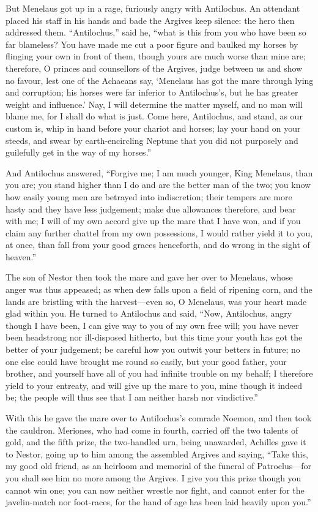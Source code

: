 But Menelaus got up in a rage, furiously angry with Antilochus. An
attendant placed his staff in his hands and bade the Argives keep silence:
the hero then addressed them. “Antilochus,” said he, “what is this from
you who have been so far blameless? You have made me cut a poor figure and
baulked my horses by flinging your own in front of them, though yours are
much worse than mine are; therefore, O princes and counsellors of the
Argives, judge between us and show no favour, lest one of the Achaeans
say, ‘Menelaus has got the mare through lying and corruption; his horses
were far inferior to Antilochus’s, but he has greater weight and
influence.’ Nay, I will determine the matter myself, and no man will blame
me, for I shall do what is just. Come here, Antilochus, and stand, as our
custom is, whip in hand before your chariot and horses; lay your hand on
your steeds, and swear by earth-encircling Neptune that you did not
purposely and guilefully get in the way of my horses.”

And Antilochus answered, “Forgive me; I am much younger, King Menelaus,
than you are; you stand higher than I do and are the better man of the
two; you know how easily young men are betrayed into indiscretion; their
tempers are more hasty and they have less judgement; make due allowances
therefore, and bear with me; I will of my own accord give up the mare that
I have won, and if you claim any further chattel from my own possessions,
I would rather yield it to you, at once, than fall from your good graces
henceforth, and do wrong in the sight of heaven.”

The son of Nestor then took the mare and gave her over to Menelaus, whose
anger was thus appeased; as when dew falls upon a field of ripening corn,
and the lands are bristling with the harvest—even so, O Menelaus,
was your heart made glad within you. He turned to Antilochus and said,
“Now, Antilochus, angry though I have been, I can give way to you of my
own free will; you have never been headstrong nor ill-disposed hitherto,
but this time your youth has got the better of your judgement; be careful
how you outwit your betters in future; no one else could have brought me
round so easily, but your good father, your brother, and yourself have all
of you had infinite trouble on my behalf; I therefore yield to your
entreaty, and will give up the mare to you, mine though it indeed be; the
people will thus see that I am neither harsh nor vindictive.”

With this he gave the mare over to Antilochus’s comrade Noemon, and then
took the cauldron. Meriones, who had come in fourth, carried off the two
talents of gold, and the fifth prize, the two-handled urn, being
unawarded, Achilles gave it to Nestor, going up to him among the assembled
Argives and saying, “Take this, my good old friend, as an heirloom and
memorial of the funeral of Patroclus—for you shall see him no more
among the Argives. I give you this prize though you cannot win one; you
can now neither wrestle nor fight, and cannot enter for the javelin-match
nor foot-races, for the hand of age has been laid heavily upon you.”

